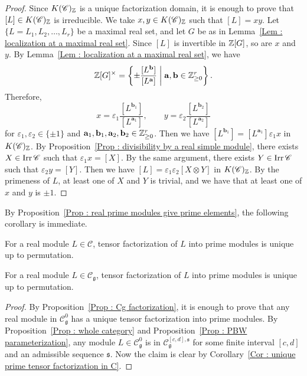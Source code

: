 \begin{proof}
Since $K(\mathscr{C})_{\mathbb{Z}}$ is a unique factorization domain,
it is enough to prove that $[L] \in K(\mathscr{C})_{\mathbb{Z}}$
is irreducible.
We take $x, y \in K(\mathscr{C})_{\mathbb{Z}}$ such that $[L] = xy$.
Let $\{L = L_1, \allowbreak L_2, \ldots, L_r\}$
be a maximal real set,
and let $G$ be as in
Lemma~\ref{Lem : localization at a maximal real set}.
Since $[L]$ is invertible in $\mathbb{Z}[G]$, so are $x$ and $y$.
By Lemma~\ref{Lem : localization at a maximal real set}, we have
\[
\mathbb{Z}[G]^\times
= \left\{
\pm \frac{[L^{\mathbf{b}}]}{[L^{\mathbf{a}}]}
\;\middle|\; \mathbf{a}, \mathbf{b} \in \mathbb{Z}_{\geq 0}^r
\right\}.
\]
Therefore,
\[
x = \varepsilon_1
\frac{[L^{\mathbf{b}_1}]}{[L^{\mathbf{a}_1}]},
\qquad
y = \varepsilon_2
\frac{[L^{\mathbf{b}_2}]}{[L^{\mathbf{a}_2}]}
\]
for $\varepsilon_1, \varepsilon_2 \in \{\pm 1\}$
and $\mathbf{a}_1, \mathbf{b}_1, \mathbf{a}_2, \mathbf{b}_2
\in \mathbb{Z}_{\geq 0}^r$.
Then we have
$[L^{\mathbf{b}_1}] = [L^{\mathbf{a}_1}]\varepsilon_1 x$
in $K(\mathscr{C})_{\mathbb{Z}}$.
By Proposition~\ref{Prop : divisibility by a real simple module},
there exists $X \in \mathop{\mathrm{Irr}}\nolimits\mathscr{C}$ such that
$\varepsilon_1 x = [X]$.
By the same argument, there exists $Y \in \mathop{\mathrm{Irr}}\nolimits\mathscr{C}$
such that $\varepsilon_2 y = [Y]$.
Then we have $[L] = \varepsilon_1\varepsilon_2[X \otimes Y]$
in $K(\mathscr{C})_{\mathbb{Z}}$.
By the primeness of $L$, at least one of $X$ and $Y$ is trivial,
and we have that at least one of $x$ and $y$ is $\pm 1$.
\end{proof}

By Proposition~\ref{Prop : real prime modules give prime elements},
the following corollary is immediate.

\begin{Cor}
\label{Cor : unique prime tensor factorization in C}
For a real module $L \in \mathscr{C}$,
tensor factorization of $L$ into prime modules
is unique up to permutation.
\end{Cor}

\begin{Cor}
\label{Cor : unique prime tensor factorization in Cg}
For a real module $L \in \mathscr{C}_{\mathfrak{g}}$,
tensor factorization of $L$ into prime modules
is unique up to permutation.
\end{Cor}

\begin{proof}
By Proposition~\ref{Prop : Cg factorization},
it is enough to prove that any real module
in $\mathscr{C}_{\mathfrak{g}}^0$
has a unique tensor factorization into prime modules.
By Proposition~\ref{Prop : whole category}
and Proposition~\ref{Prop : PBW parameterization},
any module $L \in \mathscr{C}_{\mathfrak{g}}^0$
is in $\mathscr{C}_{\mathfrak{g}}^{[c, d], \mathfrak{s}}$
for some finite interval $[c, d]$
and an admissible sequence $\mathfrak{s}$.
Now the claim is clear
by Corollary~\ref{Cor : unique prime tensor factorization in C}.
\end{proof}

